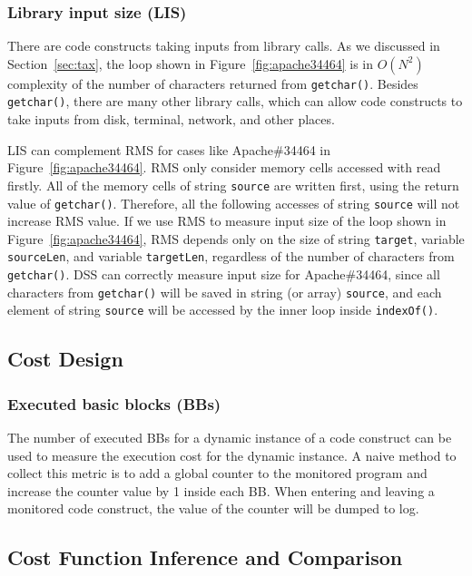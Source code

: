 \subsubsection{Library input size (LIS)}
There are code constructs taking inputs from library calls. 
As we discussed in Section~\ref{sec:tax}, 
the loop shown in Figure~\ref{fig:apache34464} 
is in $O(N^2)$ complexity of the number 
of characters returned from \texttt{getchar()}. 
Besides \texttt{getchar()}, there are many other library calls, 
which can allow code constructs to take inputs
from disk, terminal, network, and other places. 

LIS can complement RMS for cases like Apache\#34464 in Figure~\ref{fig:apache34464}.
RMS only consider memory cells accessed with read firstly. 
All of the memory cells of string \texttt{source} are written first, 
using the return value of \texttt{getchar()}.
Therefore, all the following accesses of string 
\texttt{source} will not increase RMS value.  
If we use RMS to measure input size of the loop shown in Figure~\ref{fig:apache34464},
RMS depends only on the size of string \texttt{target}, 
variable \texttt{sourceLen}, and variable \texttt{targetLen}, 
regardless of the number of characters from \texttt{getchar()}.
DSS can correctly measure input size for Apache\#34464,
since all characters from \texttt{getchar()} will be saved in string (or array) \texttt{source},
and each element of string \texttt{source} 
will be accessed by the inner loop inside \texttt{indexOf()}. 





\subsection{Cost Design}

\subsubsection{Executed basic blocks (BBs)}
The number of executed BBs for a dynamic instance of a code construct
can be used to measure the execution cost for the dynamic instance. 
A naive method to collect this metric is to add a global counter 
to the monitored program and increase the counter value by 1 inside each BB.  
When entering and leaving a monitored code construct, 
the value of the counter will be dumped to log.


\subsection{Cost Function Inference and Comparison}


